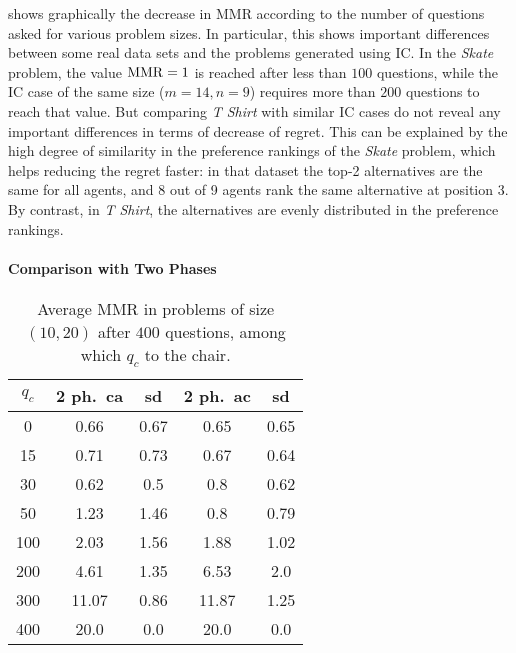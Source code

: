 \documentclass{article}
\begin{document}
 shows graphically the decrease in MMR according to the number of questions asked for various problem sizes. In particular, this shows important differences between some real data sets and the problems generated using IC.
In the \textit{Skate} problem, the value $\operatorname{MMR} = 1$ is reached after less than $100$ questions, while the IC case of the same size ($m = 14, n = 9$) requires more than $200$ questions to reach that value. But comparing \textit{T Shirt} with similar IC cases do not reveal any important differences in terms of decrease of regret. This can be explained by the high degree of similarity in the preference rankings of the \textit{Skate} problem, which helps reducing the regret faster: in that dataset the top-2 alternatives are the same for all agents, and 8 out of 9 agents rank the same alternative at position 3. By contrast, in \textit{T Shirt}, the alternatives are evenly distributed in the preference rankings. 
 
\paragraph{Comparison with Two Phases}

\begin{table}
	\caption{Average MMR in problems of size $(10, 20)$ after $400$ questions, among which $q_c$ to the chair.}
	\label{tab:twoP400}
	\begin{tabular}{S[table-figures-integer=3, table-figures-decimal=0]S[table-number-alignment = right]@{ ± }S[table-number-alignment = left, table-figures-integer=1]S[table-number-alignment = right]@{ ± }S[table-number-alignment = left, table-figures-integer=1]}
		\toprule
		{$q_c$} & {2 ph.\ ca} & {sd} & {2 ph.\ ac} & {sd} \\
		 & 0.66 & 0.67 & 0.65 & 0.65  \\
		15 & 0.71 & 0.73 & 0.67	& 0.64 \\
		30 & 0.62 & 0.5 & 0.8 & 0.62 \\
		50 & 1.23 & 1.46 & 0.8 & 0.79 \\
		100 & 2.03 & 1.56 & 1.88 & 1.02  \\
		200 & 4.61	& 1.35  & 6.53 & 2.0  \\
		300 &11.07 & 0.86& 11.87 & 1.25 \\
		400 &20.0 & 0.0 & 20.0 & 0.0 \\
		\bottomrule
	\end{tabular}
\end{table}
\end{document}
